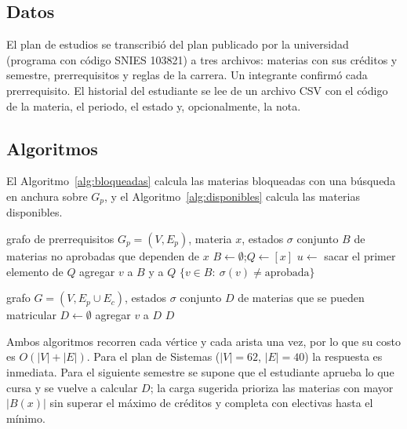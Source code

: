 \documentclass[11pt,a4paper]{article}
\begin{document}
\subsection{Datos}
El plan de estudios se transcribió del plan publicado por la universidad (programa con código SNIES 103821) a tres archivos: materias con sus créditos y semestre, prerrequisitos y reglas de la carrera. Un integrante confirmó cada prerrequisito. El historial del estudiante se lee de un archivo CSV con el código de la materia, el periodo, el estado y, opcionalmente, la nota. \parencite{uninorte_plan}

\subsection{Algoritmos}
El Algoritmo~\ref{alg:bloqueadas} calcula las materias bloqueadas con una búsqueda en anchura sobre $G_p$, y el Algoritmo~\ref{alg:disponibles} calcula las materias disponibles.

\begin{algorithm}[htbp]
\caption{Materias bloqueadas por una materia $x$}
\label{alg:bloqueadas}
\begin{algorithmic}[1]
\Require grafo de prerrequisitos $G_p=(V,E_p)$, materia $x$, estados $\sigma$
\Ensure conjunto $B$ de materias no aprobadas que dependen de $x$
\State $B\gets\emptyset$;\quad $Q\gets[x]$
  \State $u\gets$ sacar el primer elemento de $Q$
      \State agregar $v$ a $B$ y a $Q$
    \EndIf
  \EndFor
\EndWhile
\State \Return $\{v\in B:\ \sigma(v)\neq\text{aprobada}\}$
\end{algorithmic}
\end{algorithm}

\begin{algorithm}[htbp]
\caption{Materias disponibles}
\label{alg:disponibles}
\begin{algorithmic}[1]
\Require grafo $G=(V,E_p\cup E_c)$, estados $\sigma$
\Ensure conjunto $D$ de materias que se pueden matricular
\State $D\gets\emptyset$
    \State agregar $v$ a $D$
  \EndIf
\EndFor
\State \Return $D$
\end{algorithmic}
\end{algorithm}

Ambos algoritmos recorren cada vértice y cada arista una vez, por lo que su costo es $O(|V|+|E|)$. Para el plan de Sistemas ($|V|=62$, $|E|=40$) la respuesta es inmediata. Para el siguiente semestre se supone que el estudiante aprueba lo que cursa y se vuelve a calcular $D$; la carga sugerida prioriza las materias con mayor $|B(x)|$ sin superar el máximo de créditos y completa con electivas hasta el mínimo.
\end{document}
